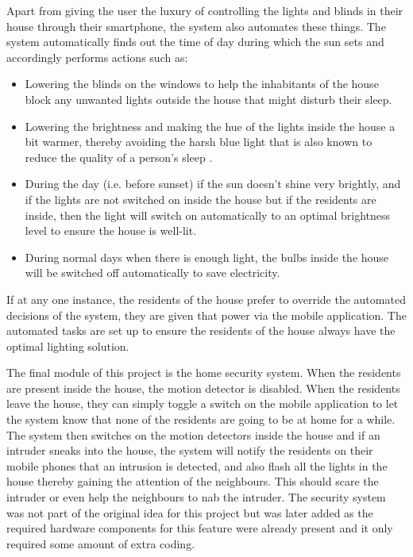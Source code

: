 \documentclass[conference]{IEEEtran}
\begin{document}
Apart from giving the user the luxury of controlling the lights and blinds in their house through their smartphone, the system also automates these things. The system automatically finds out the time of day during which the sun sets and accordingly performs actions such as:

\begin{itemize}

\item Lowering the blinds on the windows to help the inhabitants of the house block any unwanted lights outside the house that might disturb their sleep. 
 
\item Lowering the brightness and making the hue of the lights inside the house a bit warmer, thereby avoiding the harsh blue light that is also known to reduce the quality of a person’s sleep \cite{blue_light}. 
 
\item During the day (i.e. before sunset) if the sun doesn’t shine very brightly, and if the lights are not switched on inside the house but if the residents are inside, then the light will switch on automatically to an optimal brightness level to ensure the house is well-lit.
 
\item During normal days when there is enough light, the bulbs inside the house will be switched off automatically to save electricity. 
 
\end{itemize}
 
If at any one instance, the residents of the house prefer to override the automated decisions of the system, they are given that power via the mobile application. The automated tasks are set up to ensure the residents of the house always have the optimal lighting solution. 

The final module of this project is the home security system. When the residents are present inside the house, the motion detector is disabled. When the residents leave the house, they can simply toggle a switch on the mobile application to let the system know that none of the residents are going to be at home for a while. The system then switches on the motion detectors inside the house and if an intruder sneaks into the house, the system will notify the residents on their mobile phones that an intrusion is detected, and also flash all the lights in the house thereby gaining the attention of the neighbours. This should scare the intruder or even help the neighbours to nab the intruder. The security system was not part of the original idea for this project but was later added as the required hardware components for this feature were already present and it only required some amount of extra coding.
\end{document}
